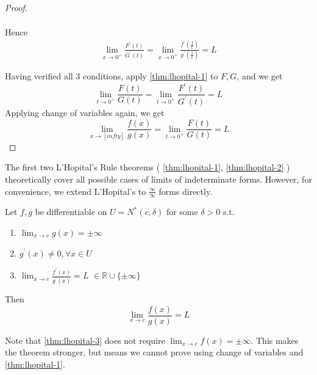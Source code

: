 \begin{proof}
\begin{enumerate}
\begin{align*}
        \end{align*}
        Hence
        \begin{align*}
            \lim_{x \to 0^{+}} 
            \frac{F^{\prime}(t)}{G^{\prime}(t)} 
            =
            \lim_{x \to 0^{+}} 
            \frac{
                f^{\prime} \left( \frac{1}{t} \right) 
            }{
                g^{\prime} \left( \frac{1}{t} \right) 
            }  = L
        \end{align*}
    \end{enumerate} 
    Having verified all 3 conditions, 
    apply \ref{thm:lhopital-1}
    to $F, G$, and we get 
    \[
        \lim_{t \to 0^+}
        \frac{F(t)}{G(t)} 
        = 
        \lim_{t \to 0^+}
        \frac{F^{\prime}(t)}{G^{\prime}(t)} 
        = L
    \]
    Applying change of variables again, we get
    \[
        \lim_{x \to [infty]}
        \frac{f(x)}{g(x)} 
        =
        \lim_{t \to 0^+}
        \frac{F(t)}{G(t)} 
        = L
    \]
    
\end{proof}

\begin{remark}
    The first two L'Hopital's Rule theorems 
    (
        \ref{thm:lhopital-1},
        \ref{thm:lhopital-2}
    )
    theoretically
    cover all possible cases of limits of indeterminate
    forms. However, for convenience, we extend L'Hopital's to 
    $ \frac{\infty}{\infty}$ forms directly.
\end{remark}

\begin{theorem}
    \label{thm:lhopital-3}
    Let $f, g$ be differentiable on 
    $U = N^{*}(c, \delta)$ for some $\delta > 0$
    s.t. 
    \begin{enumerate}
        \item $\lim_{x \to c} g(x) = \pm \infty$
        \item $g^{\prime}(x) \neq 0, \forall x \in U$
        \item $\lim_{x \to c} \frac{f^{\prime}(x)}{g^{\prime}(x)} = L$
        $\in \mathbb{R} \cup \{ \pm \infty \} $
    \end{enumerate} 
    Then 
    \[
        \lim_{x \to c} \frac{f(x)}{g(x)} = L
    \]
\end{theorem}

\begin{remark}
    Note that \ref{thm:lhopital-3}
    does not require $\lim_{x \to c}f(x) = \pm \infty$.
    This makes the theorem stronger, 
    but means we cannot prove using 
    change of variables and \ref{thm:lhopital-1}.
\end{remark}


